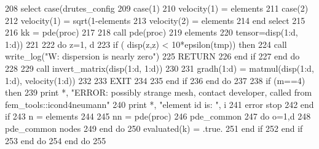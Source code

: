 \begin{DoxyCode}
208                 \textcolor{keywordflow}{select case}(drutes_config%
209                     \textcolor{keywordflow}{case}(1)
210                       velocity(1) = elements%
211                     \textcolor{keywordflow}{case}(2)
212                       velocity(1) = sqrt(1-elements%
213                       velocity(2) = elements%
214 \textcolor{keywordflow}{                end select}
215 
216                 kk = pde(proc)%
217 
218                 \textcolor{keyword}{call }pde(proc)%
219                 elements%
220                                                           tensor=disp(1:d, 1:d))
221 
222                 \textcolor{keywordflow}{do} z=1, d
223                   \textcolor{keywordflow}{if} ( disp(z,z) < 10*epsilon(tmp)) \textcolor{keywordflow}{then}
224                     \textcolor{keyword}{call }write_log(\textcolor{stringliteral}{"W: dispersion is nearly zero"})
225                     \textcolor{keywordflow}{RETURN}
226 \textcolor{keywordflow}{                  end if}
227 \textcolor{keywordflow}{                end do}
228 
229                 \textcolor{keyword}{call }invert_matrix(disp(1:d, 1:d))
230 
231                 gradh(1:d) = matmul(disp(1:d, 1:d), velocity(1:d))
232 
233                 \textcolor{keywordflow}{EXIT}
234 
235 \textcolor{keywordflow}{              end if}
236 \textcolor{keywordflow}{            end do}
237 
238             \textcolor{keywordflow}{if} (m==4) \textcolor{keywordflow}{then}
239               print *, \textcolor{stringliteral}{"ERROR: possibly strange mesh, contact developer, called from
       fem\_tools::icond4neumann"}
240               print *, \textcolor{stringliteral}{"element id is: "}, i
241               error stop
242 \textcolor{keywordflow}{            end if}
243             n = elements%
244 
245             nn = pde(proc)%
246             pde_common%
247             \textcolor{keywordflow}{do} o=1,d
248               pde_common%
      nodes%
249 \textcolor{keywordflow}{            end do}
250             evaluated(k) = .true.
251 \textcolor{keywordflow}{          end if}
252 \textcolor{keywordflow}{        end if}
253 \textcolor{keywordflow}{      end do}
254 \textcolor{keywordflow}{    end do}
255 
\end{DoxyCode}


